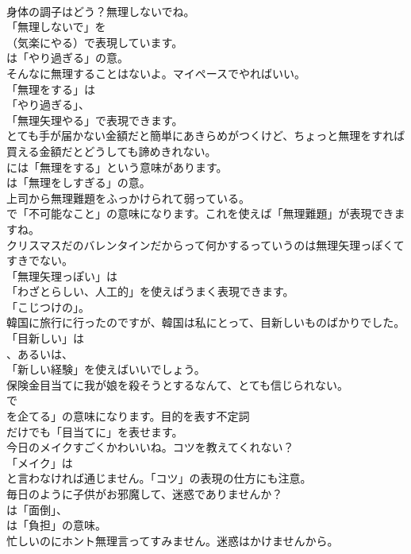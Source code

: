 \documentclass[8pt]{extreport}
\begin{document}
\begin{CJK}{UTF8}{min}
\\	身体の調子はどう？無理しないでね。 
\\	「無理しないで」を 
\\	（気楽にやる）で表現しています。
\\	は「やり過ぎる」の意。	
\\	そんなに無理することはないよ。マイペースでやればいい。 
\\	「無理をする」は
\\	「やり過ぎる」、
\\	「無理矢理やる」で表現できます。	
\\	とても手が届かない金額だと簡単にあきらめがつくけど、ちょっと無理をすれば買える金額だとどうしても諦めきれない。 
\\	には「無理をする」という意味があります。
\\	は「無理をしすぎる」の意。	
\\	上司から無理難題をふっかけられて弱っている。 
\\	で「不可能なこと」の意味になります。これを使えば「無理難題」が表現できますね。	
\\	クリスマスだのバレンタインだからって何かするっていうのは無理矢理っぽくてすきでない。 
\\	「無理矢理っぽい」は
\\	「わざとらしい、人工的」を使えばうまく表現できます。
\\	「こじつけの」。	
\\	韓国に旅行に行ったのですが、韓国は私にとって、目新しいものばかりでした。 
\\	「目新しい」は
\\	、あるいは、
\\	「新しい経験」を使えばいいでしょう。	
\\	保険金目当てに我が娘を殺そうとするなんて、とても信じられない。 
\\	で
\\	を企てる」の意味になります。目的を表す不定詞
\\	だけでも「目当てに」を表せます。	
\\	今日のメイクすごくかわいいね。コツを教えてくれない？ 
\\	「メイク」は
\\	と言わなければ通じません。「コツ」の表現の仕方にも注意。	
\\	毎日のように子供がお邪魔して、迷惑でありませんか？ 
\\	は「面倒」、
\\	は「負担」の意味。	
\\	忙しいのにホント無理言ってすみません。迷惑はかけませんから。 

\end{CJK}
\end{document}
